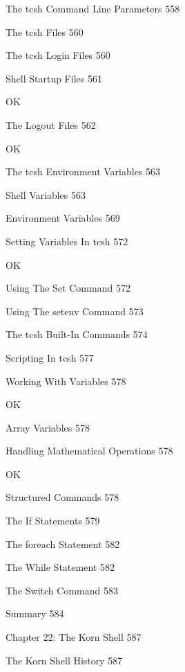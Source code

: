 The tcsh Command Line Parameters 558



The tcsh Files 560



The tcsh Login Files 560



Shell Startup Files 561

OK

The Logout Files 562

OK

The tcsh Environment Variables 563



Shell Variables 563



Environment Variables 569



Setting Variables In tcsh 572

OK

Using The Set Command 572



Using The setenv Command 573



The tcsh Built-In Commands 574



Scripting In tcsh 577



Working With Variables 578

OK

Array Variables 578



Handling Mathematical Operations 578

OK

Structured Commands 578



The If Statements 579



The foreach Statement 582



The While Statement 582



The Switch Command 583



Summary 584



Chapter 22: The Korn Shell 587



The Korn Shell History 587



